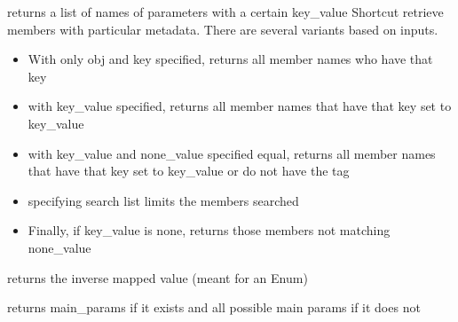 \documentclass[letterpaper,10pt,english]{sphinxmanual}
\begin{document}
\begin{fulllineitems}
\label{core_doc/atom_extension:taref.core.atom_extension.get_all_tags}
returns a list of names of parameters with a certain key\_value
Shortcut retrieve members with particular metadata. There are several variants based on inputs.
\begin{itemize}
\item {} 
With only obj and key specified, returns all member names who have that key

\item {} 
with key\_value specified, returns all member names that have that key set to key\_value

\item {} 
with key\_value and none\_value specified equal, returns all member names that have that key set to key\_value or do not have the tag

\item {} 
specifying search list limits the members searched

\item {} 
Finally, if key\_value is none, returns those members not matching none\_value

\end{itemize}

\end{fulllineitems}


\begin{fulllineitems}
\label{core_doc/atom_extension:taref.core.atom_extension.get_inv}
returns the inverse mapped value (meant for an Enum)

\end{fulllineitems}


\begin{fulllineitems}
\label{core_doc/atom_extension:taref.core.atom_extension.get_main_params}
returns main\_params if it exists and all possible main params if it does not

\end{fulllineitems}
\end{document}
